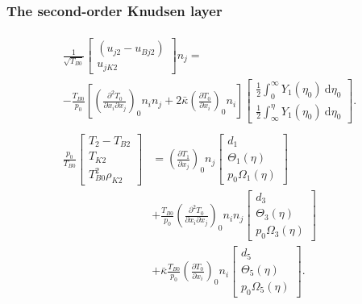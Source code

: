 \documentclass[mathserif]{beamer} %
\newcommand{\dd}{\:\mathrm{d}}
\newcommand{\pder}[2][]{\frac{\partial#1}{\partial#2}}
\newcommand{\pderder}[3][]{\frac{\partial^2#1}{\partial #2\partial #3}}
\newcommand{\onwall}[1]{\left(#1\right)_0}
\begin{document}
\begin{frame}
    \frametitle{The second-order Knudsen layer}
    \footnotesize
    \begin{gather*}
        \begin{multlined}
            \frac1{\sqrt{T_{B0}}}
                \begin{bmatrix} (u_{j2} - u_{Bj2}) \\ u_{jK2} \end{bmatrix} n_j = \\
            - \frac{T_{B0}}{p_0}\left[ \onwall{\pderder[T_0]{x_i}{x_j}}n_i n_j
                + 2\bar\kappa\onwall{\pder[T_0]{x_i}}n_i \right]
                \begin{bmatrix} \frac12\int_0^\infty Y_1(\eta_0)\dd\eta_0 \\
                    \frac12\int_\infty^{\eta} Y_1(\eta_0)\dd\eta_0 \end{bmatrix}.
        \end{multlined}\label{eq:boundary_u2n}\\
        \begin{aligned}
            \frac{p_0}{T_{B0}}
                \begin{bmatrix} T_2 - T_{B2} \\ T_{K2} \\ T_{B0}^2\rho_{K2} \end{bmatrix}
            &= \onwall{\pder[T_1]{x_j}} n_j
                \begin{bmatrix} d_1 \\ \Theta_1(\eta) \\ p_0\Omega_1(\eta) \end{bmatrix} \\
            &+ \frac{T_{B0}}{p_0}\onwall{\pderder[T_0]{x_i}{x_j}} n_i n_j
                \begin{bmatrix} d_3 \\ \Theta_3(\eta) \\ p_0\Omega_3(\eta) \end{bmatrix} \\
            &+ \bar\kappa\frac{T_{B0}}{p_0}\onwall{\pder[T_0]{x_i}} n_i
                \begin{bmatrix} d_5 \\ \Theta_5(\eta) \\ p_0\Omega_5(\eta) \end{bmatrix}.
        \end{aligned}\label{eq:boundary_T2}
    \end{gather*}
\end{frame}
\end{document}
